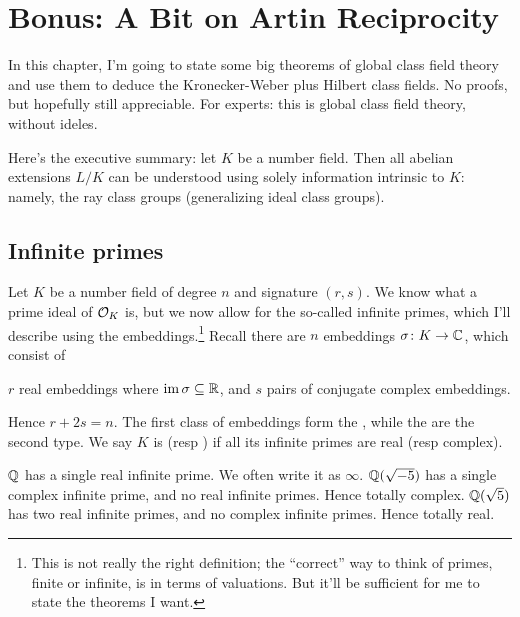 \chapter{Bonus: A Bit on Artin Reciprocity}
In this chapter, I'm going to state some big theorems of
global class field theory and use them to deduce the
Kronecker-Weber plus Hilbert class fields.
No proofs, but hopefully still appreciable.
For experts: this is global class field theory, without ideles.

Here's the executive summary: let $K$ be a number field.
Then all abelian extensions $L/K$ can be understood
using solely information intrinsic to $K$:
namely, the ray class groups (generalizing ideal class groups).

\section{Infinite primes}
Let $K$ be a number field of degree $n$ and signature $(r,s)$.
We know what a prime ideal of $\mathcal O_K$ is,
but we now allow for the so-called infinite primes,
which I'll describe using the embeddings.\footnote{This is
	not really the right definition; the ``correct'' way to think of
	primes, finite or infinite, is in terms of valuations.
	But it'll be sufficient for me to state the theorems I want.}
Recall there are $n$ embeddings $\sigma \colon K \to \mathbb C$, which consist of
\begin{itemize}
	\ii $r$ real embeddings where $\operatorname{im}\sigma \subseteq \mathbb R$, and
	\ii $s$ pairs of conjugate complex embeddings.
\end{itemize}
Hence $r+2s = n$.
The first class of embeddings form the ,
while the  are the second type.
We say $K$ is  (resp )
if all its infinite primes are real (resp complex).
\begin{example}
	\listhack
	\begin{itemize}
		\ii $\mathbb Q$ has a single real infinite prime.
		We often write it as $\infty$.
		\ii $\mathbb Q(\sqrt{-5})$ has a single complex infinite prime,
		and no real infinite primes. Hence totally complex.
		\ii $\mathbb Q(\sqrt{5})$ has two real infinite primes,
		and no complex infinite primes. Hence totally real.
	\end{itemize}
\end{example}

